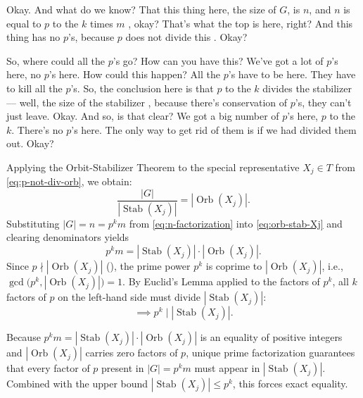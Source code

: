 \begin{proofWrapper}
\begin{speech}[00:13:59 - 00:15:49]
Okay. And what do we know? That this thing here, the size of $G$, is $n$, and $n$ is equal to $p$ to the $k$ times $m$ , okay? That's what the top is here, right? And this thing has no $p$'s, because $p$ does not divide this . Okay?

So, where could all the $p$'s go? How can you have this? We've got a lot of $p$'s here, no $p$'s here. How could this happen? All the $p$'s have to be here. They have to kill all the $p$'s. So, the conclusion here is that $p$ to the $k$ divides the stabilizer --- well, the size of the stabilizer , because there's conservation of $p$'s, they can't just leave. Okay. And so, is that clear? We got a big number of $p$'s here, $p$ to the $k$. There's no $p$'s here. The only way to get rid of them is if we had divided them out. Okay?
\end{speech}

\begin{content}
Applying the Orbit-Stabilizer Theorem to the special representative $X_j \in T$ from \eqref{eq:p-not-div-orb}, we obtain:
\begin{equation}\label{eq:orb-stab-Xj}
\frac{|G|}{|\operatorname{Stab}(X_j)|} = |\operatorname{Orb}(X_j)|.
\end{equation}
Substituting $|G| = n = p^k m$ from \eqref{eq:n-factorization} into \eqref{eq:orb-stab-Xj} and clearing denominators yields
\[
p^k m = |\operatorname{Stab}(X_j)| \cdot |\operatorname{Orb}(X_j)|.
\]
Since $p \nmid |\operatorname{Orb}(X_j)|$ (), the prime power $p^k$ is coprime to $|\operatorname{Orb}(X_j)|$, i.e., $\gcd\bigl(p^k, |\operatorname{Orb}(X_j)|\bigr) = 1$. By Euclid's Lemma applied to the factors of $p^k$, all $k$ factors of $p$ on the left-hand side must divide $|\operatorname{Stab}(X_j)|$:
\begin{equation}\label{eq:pk-divides-stab}
\implies p^k \mid |\operatorname{Stab}(X_j)|.
\end{equation}
\end{content}

\begin{insight}
Because $p^k m = |\operatorname{Stab}(X_j)| \cdot |\operatorname{Orb}(X_j)|$ is an equality of positive integers and $|\operatorname{Orb}(X_j)|$ carries zero factors of $p$, unique prime factorization guarantees that every factor of $p$ present in $|G| = p^k m$ must appear in $|\operatorname{Stab}(X_j)|$. Combined with the upper bound $|\operatorname{Stab}(X_j)| \le p^k$, this forces exact equality.
\end{insight}


\end{proofWrapper}
